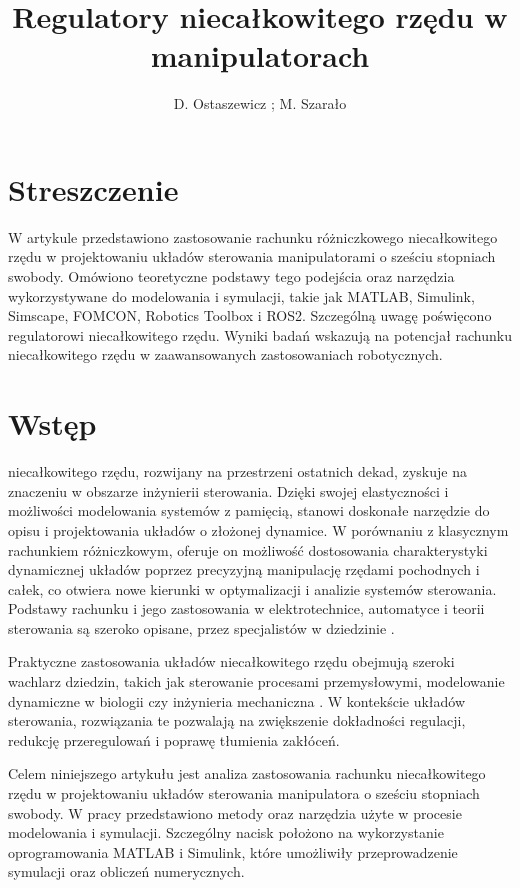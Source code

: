 \documentclass[journal,twoside,web]{ieeecolor}
\begin{document}
\title{Regulatory niecałkowitego rzędu w manipulatorach}

\author{D. Ostaszewicz \IEEEmembership{}; M. Szarało \IEEEmembership{}}

\maketitle
\onehalfspacing

\section{Streszczenie}
W artykule przedstawiono zastosowanie rachunku różniczkowego niecałkowitego rzędu w projektowaniu układów sterowania manipulatorami o sześciu stopniach swobody. Omówiono teoretyczne podstawy tego podejścia oraz narzędzia wykorzystywane do modelowania i symulacji, takie jak MATLAB, Simulink, Simscape, FOMCON, Robotics Toolbox i ROS2. Szczególną uwagę poświęcono regulatorowi niecałkowitego rzędu. Wyniki badań wskazują na potencjał rachunku niecałkowitego rzędu w zaawansowanych zastosowaniach robotycznych.

\section{Wstęp}
\label{sec:introduction}
 niecałkowitego rzędu, rozwijany na przestrzeni ostatnich dekad, zyskuje na znaczeniu w obszarze inżynierii sterowania. Dzięki swojej elastyczności i możliwości modelowania systemów z pamięcią, stanowi doskonałe narzędzie do opisu i projektowania układów o złożonej dynamice. W porównaniu z klasycznym rachunkiem różniczkowym, oferuje on możliwość dostosowania charakterystyki dynamicznej układów poprzez precyzyjną manipulację rzędami pochodnych i całek, co otwiera nowe kierunki w optymalizacji i analizie systemów sterowania. Podstawy rachunku i jego zastosowania w elektrotechnice, automatyce i teorii sterowania są szeroko opisane, przez specjalistów w dziedzinie \cite{Fractional, Selected, Pawlusz, Popolizio}.  

Praktyczne zastosowania układów niecałkowitego rzędu obejmują szeroki wachlarz dziedzin, takich jak sterowanie procesami przemysłowymi, modelowanie dynamiczne w biologii czy inżynieria mechaniczna \cite{Kumar, plant, falling, power}. W kontekście układów sterowania, rozwiązania te pozwalają na zwiększenie dokładności regulacji, redukcję przeregulowań i poprawę tłumienia zakłóceń.

Celem niniejszego artykułu jest analiza zastosowania rachunku niecałkowitego rzędu w projektowaniu układów sterowania manipulatora o sześciu stopniach swobody. W pracy przedstawiono metody oraz narzędzia użyte w procesie modelowania i symulacji. Szczególny nacisk położono na wykorzystanie oprogramowania MATLAB i Simulink, które umożliwiły przeprowadzenie symulacji oraz obliczeń numerycznych.
\end{document}

